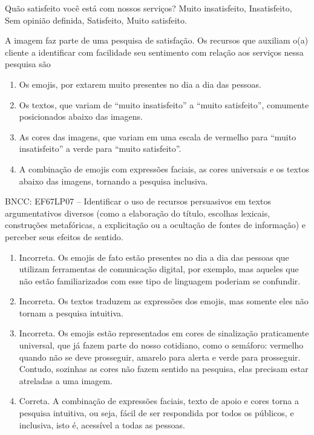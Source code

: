 Quão satisfeito você está com nossos serviços? Muito insatisfeito,
Insatisfeito, Sem opinião definida, Satisfeito, Muito satisfeito.

A imagem faz parte de uma pesquisa de satisfação. Os recursos que
auxiliam o(a) cliente a identificar com facilidade seu sentimento com
relação aos serviços nessa pesquisa são

\begin{enumerate}
\def\labelenumi{\alph{enumi})}
\item Os emojis, por extarem muito presentes no dia a dia das pessoas.
\item Os textos, que variam de ``muito insatisfeito'' a ``muito
satisfeito'', comumente posicionados abaixo das imagens.
\item As cores das imagens, que variam em uma escala de vermelho para
``muito insatisfeito'' a verde para ``muito satisfeito''.
\item A combinação de emojis com expressões faciais, as cores universais e
os textos abaixo das imagens, tornando a pesquisa inclusiva.
\end{enumerate}

BNCC: EF67LP07 -- Identificar o uso de recursos persuasivos em textos
argumentativos diversos (como a elaboração do título, escolhas lexicais,
construções metafóricas, a explicitação ou a ocultação de fontes de
informação) e perceber seus efeitos de sentido.

\begin{enumerate}
\def\labelenumi{\alph{enumi})}
\item Incorreta. Os emojis de fato estão presentes no dia a dia das pessoas
que utilizam ferramentas de comunicação digital, por exemplo, mas
aqueles que não estão familiarizados com esse tipo de linguagem poderiam
se confundir.
\item Incorreta. Os textos traduzem as expressões dos emojis, mas somente
eles não tornam a pesquisa intuitiva.
\item Incorreta. Os emojis estão representados em cores de sinalização
praticamente universal, que já fazem parte do nosso cotidiano, como o
semáforo: vermelho quando não se deve prosseguir, amarelo para alerta e
verde para prosseguir. Contudo, sozinhas as cores não fazem sentido na
pesquisa, elas precisam estar atreladas a uma imagem.
\item Correta. A combinação de expressões faciais, texto de apoio e cores
torna a pesquisa intuitiva, ou seja, fácil de ser respondida por todos
os públicos, e inclusiva, isto é, acessível a todas as pessoas.
\end{enumerate}

